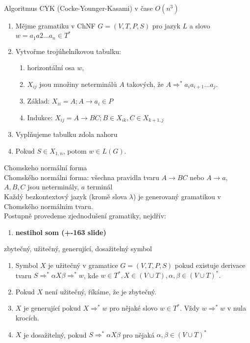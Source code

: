 \documentclass[../main.tex]{subfiles}
\begin{document}
\begin{theorem}
    Algoritmus CYK (Cocke-Younger-Kasami) v čase $O(n^3)$\\

    \begin{enumerate}
        \item Mějme gramatiku v ChNF $G = (V,T,P,S)$ pro jazyk $L$ a slovo $w = a_1a2\dots a_n \in T^*$
        \item Vytvořme trojúhelníkovou tabulku:
        \begin{enumerate}
            \item horizontální osa $w$,
            \item $X_{ij}$ jsou množiny neterminálů $A$ takových, že $A \Rightarrow^* a_i a_{i+1}\dots a_j$.
            \item Základ: $X_{ii} =  {A; A\rightarrow a_i \in P}$
            \item Indukce: $X_{ij} = {A \rightarrow BC; B\in X_{ik}, C \in X_{k+1,j}}$
        \end{enumerate}
        \item Vyplňujeme tabulku zdola nahoru
        \item Pokud $S \in X_{1,n}$, potom $w \in L(G)$.
    \end{enumerate}
\end{theorem}

\begin{definition}
    Chomskeho normální forma\\

    Chomského normálni forma: všechna pravidla tvaru $A \rightarrow BC$ nebo $A \rightarrow a$, $A,B,C$ jsou neterminály, $a$ terminál\\
    Každý bezkontextový jazyk (kromě slova $\lambda$) je generovaný gramatikou v Chomského normálním tvaru.\\
    Postupně provedeme zjednodušení gramatiky, nejdřív:
    \begin{enumerate}
        \item \textbf{nestihol som (+-163 slide)}
    \end{enumerate}
\end{definition}

\begin{definition}
    zbytečný, užitečný, generující, dosažitelný symbol\\

    \begin{enumerate}
        \item Symbol $X$ je užitečný v gramatice $G = (V,T,P,S)$ pokud existuje derivace tvaru $S \Rightarrow^* \alpha X \beta \Rightarrow^* w$, kde $w \in T^*, X \in (V\cup T), \alpha, \beta \in (V\cup T)^*.$
        \item Pokud $X$ není užitečný, říkáme, že je zbytečný.
        \item $X$ je generující pokud $X \Rightarrow^* w$ pro nějaké slovo $w \in T^*$. Vždy $w\Rightarrow^* w$ v nula krocích.
        \item $X$ je dosažitelný, pokud $S \Rightarrow^* \alpha X\beta$ pro nějaká $\alpha, \beta \in (V\cup T)^*$
    \end{enumerate}
\end{definition}
\end{document}
